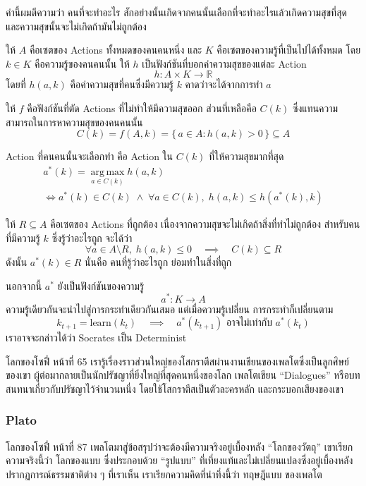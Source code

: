 คำนี้ผมตีความว่า คนที่จะทำอะไร สักอย่างนั้นเกิดจากคนนั้นเลือกที่จะทำอะไรแล้วเกิดความสุขที่สุด และความสุขนั้นจะไม่เกิดถ้ามันไม่ถูกต้อง

\clearpage
ให้ $A$ คือเซตของ Actions ทั้งหมดของคนคนหนึ่ง และ $K$ คือเซตของความรู้ที่เป็นไปได้ทั้งหมด โดย $k \in K$ คือความรู้ของคนคนนั้น ให้ $h$ เป็นฟังก์ชันที่บอกค่าความสุขของแต่ละ Action
\[
h : A \times K \to \mathbb{R}
\]
โดยที่ $h(a, k)$ คือค่าความสุขที่คนซึ่งมีความรู้ $k$ คาดว่าจะได้จากการทำ $a$

ให้ $f$ คือฟังก์ชันที่ตัด Actions ที่ไม่ทำให้มีความสุขออก ส่วนที่เหลือคือ $C(k)$ ซึ่งแทนความสามารถในการหาความสุขของคนคนนั้น
\[
C(k) = f(A, k) = \{\, a \in A : h(a, k) > 0 \,\} \subseteq A
\]

Action ที่คนคนนั้นจะเลือกทำ คือ Action ใน $C(k)$ ที่ให้ความสุขมากที่สุด
\begin{gather*}
a^*(k) = \operatorname*{arg\,max}_{a \in C(k)} h(a, k) \\
\iff a^*(k) \in C(k) \;\land\; \forall a \in C(k),\; h(a, k) \leq h(a^*(k), k)
\end{gather*}

ให้ $R \subseteq A$ คือเซตของ Actions ที่ถูกต้อง เนื่องจากความสุขจะไม่เกิดถ้าสิ่งที่ทำไม่ถูกต้อง สำหรับคนที่มีความรู้ $k$ ซึ่งรู้ว่าอะไรถูก จะได้ว่า
\[
\forall a \in A \setminus R,\; h(a, k) \leq 0
\quad\implies\quad C(k) \subseteq R
\]
ดังนั้น $a^*(k) \in R$ นั่นคือ คนที่รู้ว่าอะไรถูก ย่อมทำในสิ่งที่ถูก

นอกจากนี้ $a^*$ ยังเป็นฟังก์ชันของความรู้
\[
a^* : K \to A
\]
ความรู้เดียวกันจะนำไปสู่การกระทำเดียวกันเสมอ แต่เมื่อความรู้เปลี่ยน การกระทำก็เปลี่ยนตาม
\[
k_{t+1} = \mathrm{learn}(k_t) \quad\implies\quad a^*(k_{t+1}) \text{ อาจไม่เท่ากับ } a^*(k_t)
\]
เราอาจจะกล่าวได้ว่า Socrates เป็น Determinist
\clearpage

\begin{bookquote}{โลกของโซฟี่ หน้าที่ 65}
เรารู้เรื่องราวส่วนใหญ่ของโสกราตีสผ่านงานเขียนของเพลโตซึ่งเป็นลูกศิษย์ของเขา ผู้ต่อมากลายเป็นนักปรัชญาที่ยิ่งใหญ่ที่สุดคนหนึ่งของโลก เพลโตเขียน “Dialogues” หรือบทสนทนาเกี่ยวกับปรัชญาไว้จำนวนหนึ่ง โดยใช้โสกราตีสเป็นตัวละครหลัก และกระบอกเสียงของเขา
\end{bookquote}

\subsubsection{Plato}

\begin{bookquote}{โลกของโซฟี่ หน้าที่ 87}
เพลโตมาสู่ข้อสรุปว่าจะต้องมีความจริงอยู่เบื้องหลัง “โลกของวัตถุ” เขาเรียกความจริงนี้ว่า โลกของแบบ ซึ่งประกอบด้วย “รูปแบบ” ที่เที่ยงแท้และไม่เปลี่ยนแปลงซึ่งอยู่เบื้องหลังปรากฏการณ์ธรรมชาติต่าง ๆ ที่เราเห็น เราเรียกความคิดที่น่าทึ่งนี้ว่า ทฤษฎีแบบ ของเพลโต
\end{bookquote}

